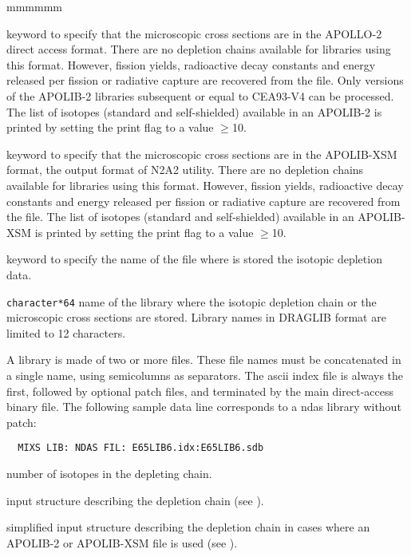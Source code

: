 \begin{ListeDeDescription}{mmmmmm}
\item[\moc{APLIB2}] keyword to specify that the microscopic cross sections are
in the APOLLO-2 direct access format. There are no depletion chains available for libraries
using this format. However, fission yields, radioactive decay constants and
energy released per fission or radiative capture are recovered from the file.
Only versions of the APOLIB-2 libraries subsequent or equal to CEA93-V4 can be
processed. The list of isotopes (standard and self-shielded) available in an APOLIB-2
is printed by setting the print flag to a value $\ge$10.

\item[\moc{APXSM}] keyword to specify that the microscopic cross sections are
in the APOLIB-XSM format, the output format of N2A2 utility. There are no depletion chains available for libraries
using this format. However, fission yields, radioactive decay constants and
energy released per fission or radiative capture are recovered from the file.
The list of isotopes (standard and self-shielded) available in an APOLIB-XSM
is printed by setting the print flag to a value $\ge$10.

\item[\moc{FIL:}] keyword to specify the name of the file where is stored the
isotopic depletion data. 

\item[\dusa{NAMEFIL}] {\tt character*64} name of the library
where the isotopic depletion chain or the microscopic cross sections are stored. Library names in DRAGLIB
format are limited to 12 characters.

A  library is made of two or more files. These file names must be concatenated in a single
 name, using semicolumns as separators. The {\sc ascii} index file is always the first,
followed by optional patch files, and terminated by the main direct-access binary file. The
following sample data line corresponds to a {\sc ndas} library without patch:
\begin{verbatim}
  MIXS LIB: NDAS FIL: E65LIB6.idx:E65LIB6.sdb
\end{verbatim}

\item[\dusa{ndepl}] number of isotopes in the depleting chain.

\item[\dstr{descdepl}] input structure describing the
depletion chain (see ).

\item[\dstr{descdeplA2}] simplified input structure describing the
depletion chain in cases where an APOLIB-2 or APOLIB-XSM file is used (see ).


\end{ListeDeDescription}

